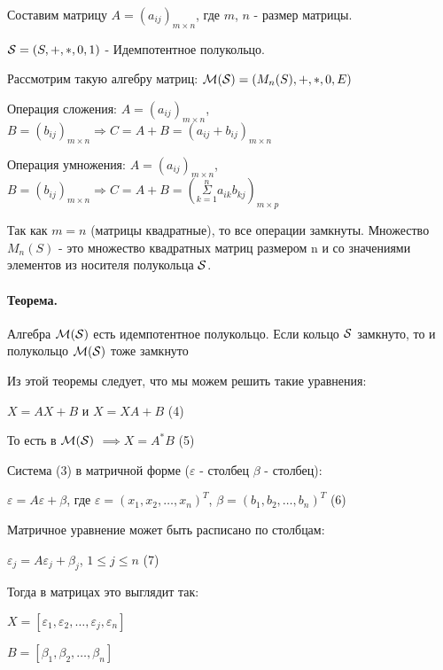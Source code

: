 \documentclass{report}
\begin{document}
Составим матрицу $A = (a_{ij})_{m \times n}$, где $m$, $n$ - размер матрицы.

\medskip

${\cal S} = (S, +, *, 0, 1)$ - Идемпотентное полукольцо.

Рассмотрим такую алгебру матриц: ${\cal M(S)} = (M_n(S), +, *, 0, E)$

\medskip

Операция сложения:
$A = (a_{ij})_{m \times n}$, $B = (b_{ij})_{m \times n} \Rightarrow
    C = A + B = (a_{ij} + b_{ij})_{m \times n}$

Операция умножения:
$A = (a_{ij})_{m \times n}$, $B = (b_{ij})_{m \times n} \Rightarrow
    C = A + B = (\underset{k=1}{\overset{n}{\Sigma}}a_{ik}b_{kj})_{m \times p}$

\medskip

Так как $m = n$ (матрицы квадратные), то все операции замкнуты. Множество $M_n(S)$ -
это множество квадратных матриц размером n и со значениями элементов из носителя полукольца $\cal S$.

\paragraph*{Теорема.}
Алгебра $\cal M(S)$ есть идемпотентное полукольцо. Если  кольцо $\cal S$ замкнуто, то и полукольцо  $\cal M(S)$ тоже
замкнуто

\medskip

Из этой теоремы следует, что мы можем решить такие уравнения:

 $X = AX + B$ и  $X = XA + B$ (4)

 То есть в  $\cal M(S)$ $\implies X = A^{*}B$ (5)


 \medskip

Система (3) в матричной форме ($\varepsilon$ - столбец  $\beta$ - столбец):

$\varepsilon = A\varepsilon + \beta$, где $\varepsilon = (x_1, x_2, \ldots, x_{n})^{T}$,
$\beta = (b_1,b_2,\ldots,b_{n})^{T}$ (6)


\medskip

Матричное уравнение может быть расписано по столбцам:

$\varepsilon_j = A\varepsilon_j + \beta_j$,  $1 \le j \le n$ (7)


Тогда в матрицах это выглядит так:

$X = [\varepsilon_1, \varepsilon_2, \ldots, \varepsilon_j, \varepsilon_n]$

$B = [\beta_1, \beta_2, \ldots, \beta_{n}]$
\end{document}
